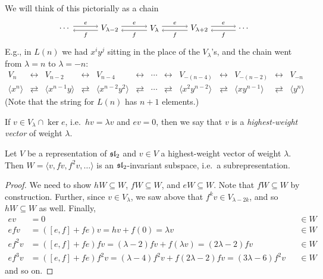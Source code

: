 We will think of this pictorially as a chain
\[
\begin{tikzpicture}[baseline=-3pt,x=1.9cm]
  \node (a) at (0,0) {$\cdots$};
  \node (b) at (1,0) {$V_{\lambda-2}$};
  \node (c) at (2,0) {$V_\lambda$};
  \node (d) at (3,0) {$V_{\lambda+2}$};
  \node (z) at (4,0) {$\cdots$};
  \foreach \x/\y in {a/b,b/c,c/d,d/z} {
    \draw[->] ([yshift=2.5pt]\x.east) -- node[above=-1pt]{\scriptsize $e$} ([yshift=2.5pt]\y.west);
    \draw[<-] ([yshift=-2.5pt]\x.east) -- node[below=-1pt]{\scriptsize $f$} ([yshift=-2.5pt]\y.west);
  }
\end{tikzpicture}
\]
E.g., in $L(n)$ we had $x^iy^j$ sitting in the place of the $V_\lambda$'s, and
the chain went from $\lambda = n$ to $\lambda = -n$:
\[
\begin{array}{*{13}{c}}
  V_n & \longleftrightarrow & V_{n-2} & \longleftrightarrow & V_{n-4} &
  \longleftrightarrow & \cdots & \longleftrightarrow & V_{-(n-4)} &
  \longleftrightarrow & V_{-(n-2)} & \longleftrightarrow & V_{-n}\\[2pt]
  \langle x^n\rangle & \rightleftarrows & \langle x^{n-1}y\rangle &
  \rightleftarrows & \langle x^{n-2}y^2\rangle & \rightleftarrows & \cdots &
  \rightleftarrows & \langle x^2y^{n-2}\rangle & \rightleftarrows &
  \langle xy^{n-1}\rangle & \rightleftarrows & \langle y^n\rangle
\end{array}
\]
(Note that the string for $L(n)$ has $n + 1$ elements.)

\begin{definition}
If $v \in V_\lambda \cap \ker e$, i.e.\ $hv = \lambda v$ and $ev = 0$, then we
say that $v$ is a \emph{highest-weight vector} of weight $\lambda$.
\end{definition}

\begin{lemma}
Let $V$ be a representation of $\sl_2$ and $v \in V$ a highest-weight vector
of weight $\lambda$. Then $W = \langle v, fv, f^2v, \dots\rangle$ is an
$\sl_2$-invariant subspace, i.e.\ a subrepresentation.
\end{lemma}

\begin{proof}
We need to show $hW \subseteq W$, $fW \subseteq W$, and $eW \subseteq W$.
Note that $fW \subseteq W$ by construction. Further, since $v \in V_\lambda$,
we saw above that $f^kv \in V_{\lambda - 2k}$, and so $hW \subseteq W$ as well.
Finally,
\begin{align*}
  ev &= 0 && \in W\\
  efv &= ([e, f] + fe)v = hv + f(0) = \lambda v && \in W\\
  ef^2v &= ([e, f] + fe)fv = (\lambda - 2)fv + f(\lambda v) = (2\lambda - 2)fv && \in W\\
  ef^3v &= ([e, f] + fe)f^2v = (\lambda - 4)f^2v + f(2\lambda - 2)fv = (3\lambda - 6)f^2v && \in W
\end{align*}
and so on.
\end{proof}

